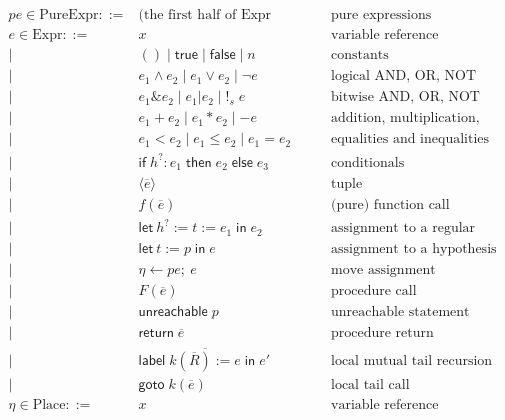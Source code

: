 \documentclass[acmsmall,nonacm]{acmart}
\begin{document}
\begin{align*}
  pe\in \mathrm{PureExpr} ::={}&\mbox{(the first half of Expr below)}&&\mbox{pure expressions}\\
  e \in \mathrm{Expr} ::={}& x&&\mbox{variable reference}\\
    \mid{}&()\mid \mathsf{true}\mid \mathsf{false}\mid n&&\mbox{constants}\\
    \mid{}&e_1 \land e_2\mid e_1 \lor e_2\mid \neg e&&\mbox{logical AND, OR, NOT}\\
    \mid{}&e_1 \mathbin\texttt{\&} e_2\mid e_1 \mathbin\texttt{|} e_2\mid \texttt{!}_s\; e&&\mbox{bitwise AND, OR, NOT}\\
    \mid{}&e_1 + e_2\mid e_1 * e_2\mid -e&&\mbox{addition, multiplication, negation}\\
    \mid{}&e_1 < e_2\mid e_1 \le e_2\mid e_1 = e_2&&\mbox{equalities and inequalities}\\
    \mid{}&\mathsf{if}\;h^? : e_1\;\mathsf{then}\;e_2\;\mathsf{else}\;e_3&&\mbox{conditionals}\\
    \mid{}&\langle\overline{e}\rangle&&\mbox{tuple}\\
    \mid{}&f(\overline{e})&&\mbox{(pure) function call}\\[2mm]
%
    \mid{}&\mathsf{let}\ h^? := t := e_1\;\mathsf{in}\; e_2 &&\mbox{assignment to a regular variable}\\
    \mid{}& \mathsf{let}\ t := p\;\mathsf{in}\; e&&\mbox{assignment to a hypothesis}\\
    \mid{}& \eta \gets pe;\ e&&\mbox{move assignment}\\
    \mid{}&F(\overline{e})&&\mbox{procedure call}\\
    \mid{}&\mathsf{unreachable}\;p&&\mbox{unreachable statement}\\
    \mid{}&\mathsf{return}\; \overline{e}&&\mbox{procedure return}\\
    \mid{}&\mathsf{label}\;\overline{k(\overline{R}):=e}\;\mathsf{in}\;e'&&\mbox{local mutual tail recursion}\\
    \mid{}&\mathsf{goto}\;k(\overline{e})&&\mbox{local tail call}\\
  \eta \in \mathrm{Place} ::={}& x&&\mbox{variable reference}\\
\end{align*}
\end{document}
